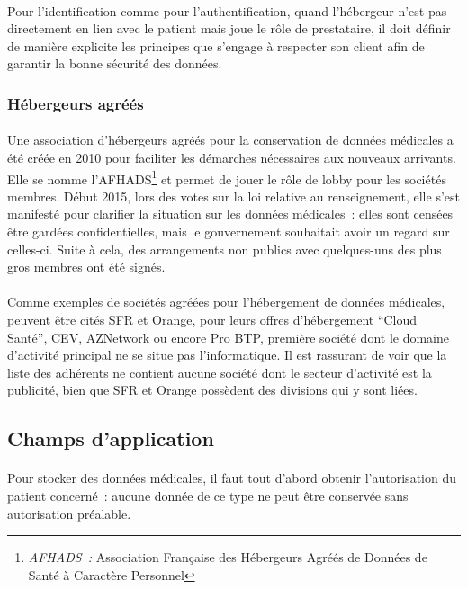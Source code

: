 \paragraph{}
Pour l'identification comme pour l'authentification, quand l'hébergeur n'est
pas directement en lien avec le patient mais joue le rôle de prestataire, il
doit définir de manière explicite les principes que s'engage à respecter son
client afin de garantir la bonne sécurité des données.


        \subsubsection{Hébergeurs agréés}

\paragraph{}
Une association d'hébergeurs agréés pour la conservation de données médicales a
été créée en 2010 pour faciliter les démarches nécessaires aux nouveaux
arrivants. Elle se nomme l'AFHADS\footnote{\emph{AFHADS~: }
Association Française des Hébergeurs Agréés de Données de Santé à Caractère
Personnel} et permet de jouer le rôle de lobby pour les sociétés membres. Début
2015, lors des votes sur la loi relative au renseignement, elle s'est manifesté
pour clarifier la situation sur les données médicales~: elles sont censées être
gardées confidentielles, mais le gouvernement souhaitait avoir un regard sur
celles-ci. Suite à cela, des arrangements non publics avec quelques-uns des
plus gros membres ont été signés.

\paragraph{}
Comme exemples de sociétés agréées pour l'hébergement de données médicales,
peuvent être cités SFR et Orange, pour leurs offres d'hébergement ``Cloud
Santé'', CEV, AZNetwork ou encore Pro BTP, première société dont le domaine
d'activité principal ne se situe pas l'informatique. Il est rassurant de voir
que la liste des adhérents ne contient aucune société dont le secteur
d'activité est la publicité, bien que SFR et Orange possèdent des divisions qui
y sont liées.

        \subsection{Champs d'application}

\paragraph{}
Pour stocker des données médicales, il faut tout d'abord obtenir l'autorisation
du patient concerné~: aucune donnée de ce type ne peut être conservée sans
autorisation préalable.

